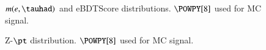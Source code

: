 \begin{figure}[h!tbp]
	\centering
	\hfill
	\caption{$m(e,\tauhad)$ and eBDTScore distributions. $\POWPY[8]$ used for MC signal.}
	\label{AFig7PN}
\end{figure} 

\begin{figure}[h!tbp]
	\centering
	\hfill
	\caption{Z-$\pt$ distribution. $\POWPY[8]$ used for MC signal.}
	\label{AFig8PN}
\end{figure} 

